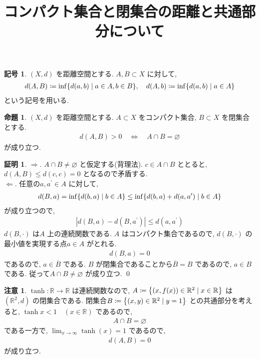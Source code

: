 \documentclass[10pt, fleqn, label-section=none]{bxjsarticle}
\title{コンパクト集合と閉集合の距離と共通部分について}
\date{}
\author{}
\theoremstyle{definition}
\newtheorem{prop}[dfn]{命題}
\newtheorem{notation}[dfn]{記号}
\newtheorem*{pf*}{証明}
\newtheorem{remark}[dfn]{注意}
\newcommand{\cbra}[1]{\mleft\{#1\mright\}}
\newcommand{\abs}[1]{\left|#1\right|}
\newcommand{\LR}{\Leftrightarrow}
\newcommand{\naraba}{\Rightarrow}
\newcommand{\gyaku}{\Leftarrow}
\renewcommand{\;}{\, ; \,}
\begin{document}
\maketitle

\section{}

\begin{notation}$(X, d)$ を距離空間とする. $A, B \subset X$ に対して, 
\begin{align*} d(A, B) \coloneqq \inf \cbra{d(a, b) \mid a \in A, b \in B}, \quad d(A, b) \coloneqq \inf \cbra{d(a, b) \mid a \in A}           \end{align*}
という記号を用いる. 
\end{notation}

\begin{prop}$(X, d)$ を距離空間とする. $A \subset X$ をコンパクト集合, $B \subset X$ を閉集合とする. 
\begin{align*} d(A, B) > 0 \quad \LR \quad A \cap B = \varnothing \end{align*}
が成り立つ. 
\end{prop}
\begin{pf*}$\naraba$. $A \cap B \neq \varnothing$ と仮定する(背理法). $c \in A \cap B$ ととると, $d(A, B) \leq d(c, c) = 0$ となるので矛盾する. \\
$\gyaku$. 任意の$a, a^\prime \in A$ に対して, 
\begin{align*}d(B, a) = \inf \cbra{d(b, a) \mid b \in A} \leq \inf \cbra{d(b, a) + d(a, a^\prime) \mid b \in A}   \end{align*}
が成り立つので, 
\begin{align*} \abs{d(B, a) - d(B, a^\prime)} \leq d(a, a^\prime)\end{align*}
$d(B, \cdot)$ は$A$ 上の連続関数である. $A$ はコンパクト集合であるので, $d(B, \cdot)$ の最小値を実現する点$a \in A$ がとれる. 
\begin{align*} d(B, a) = 0\end{align*}
であるので, $a \in \overline B$ である. $B$ が閉集合であることから$\overline B = B $ であるので, $a \in B$ である. 従って$A \cap B \neq \varnothing$ が成り立つ.  
\qed
\end{pf*}

\begin{remark}$\tanh : \mathbb R \rightarrow \mathbb R$ は連続関数なので, $A \coloneqq \cbra{(x, f(x)) \in \mathbb R^2 \mid x \in \mathbb R}$ は$(\mathbb R^2, d)$ の閉集合である. 閉集合$B \coloneqq \cbra{(x, y) \in \mathbb R^2 \mid y = 1}$ との共通部分を考えると, $\tanh x < 1 \quad (x \in \mathbb R)$ であるので, 
\begin{align*} A \cap B = \varnothing \end{align*}
である一方で, $\lim_{x \rightarrow \infty} \tanh (x) = 1$ であるので, 
\begin{align*} d(A, B) = 0 \end{align*}
が成り立つ. 
\end{remark}
\end{document}

